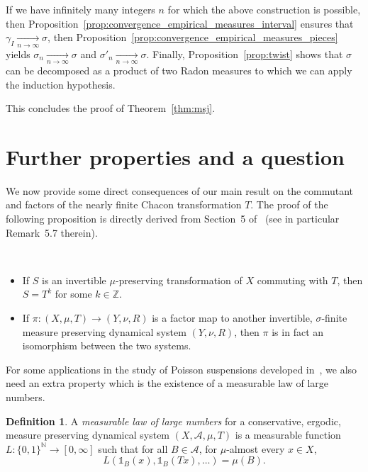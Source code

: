 \documentclass[10pt]{amsart}
\theoremstyle{definition}\newtheorem{defi}[theo]{Definition}\newtheorem{rema}[theo]{Remark}\newtheorem{exam}[theo]{Example}\newtheorem{exem}[theo]{Example}\newtheorem{nota}[theo]{Notation}
\newcommand{\tend}[3][]{\xrightarrow[#2\to#3]{#1}}
\newcommand{\ind}[1]{\mathds{1}_{#1}}
\newcommand{\ZZ}{\mathbb{Z}}
\newcommand{\NN}{\mathbb{N}}
\newcommand{\A}{\mathscr{A}}
\begin{document}
If we have infinitely many integers $n$ for which the above construction is possible, then Proposition~\ref{prop:convergence_empirical_measures_interval} ensures that $\gamma_I\tend{n}{\infty}\sigma$, then Proposition~\ref{prop:convergence_empirical_measures_pieces} yields $\sigma_n\tend{n}{\infty}\sigma$ and $\sigma'_n\tend{n}{\infty}\sigma$. Finally, Proposition~\ref{prop:twist} shows that $\sigma$ can be decomposed as a product of two Radon measures to which we can apply the induction hypothesis.


This concludes the proof of Theorem~\ref{thm:msj}.


\section{Further properties and a question}
\label{sec:further_properties}

We now provide some direct consequences of our main result on the commutant and factors of the nearly finite Chacon transformation $T$. The proof of the following proposition is directly derived from Section~5 of~\cite{ChaconInfinite} (see in particular Remark~5.7 therein).

\begin{prop}\ 
\begin{itemize}
\item If $S$ is an invertible $\mu$-preserving transformation of $X$ commuting with $T$, then $S=T^k$ for some $k\in\ZZ$.
\item If $\pi:(X,\mu,T)\to (Y,\nu,R)$ is a factor map to another invertible, $\sigma$-finite measure preserving dynamical system $(Y,\nu,R)$, then $\pi$ is in fact an isomorphism between the two systems.
\end{itemize}
\end{prop}

For some applications in the study of Poisson suspensions developed in~\cite{sushis}, we also need an extra property which is the existence of a measurable law of large numbers.


\begin{defi}
A \emph{measurable law of large numbers} for a conservative, ergodic, measure preserving dynamical system $(X,\A,\mu,T)$ is a measurable function $L:\{0,1\}^\NN\to[0,\infty]$ such that for all $B\in\A$, for $\mu$-almost every $x\in X$,
\[
L\left(\ind{B}(x),\ind{B}(Tx),\ldots\right) = \mu(B).
\]
\end{defi}
\end{document}
